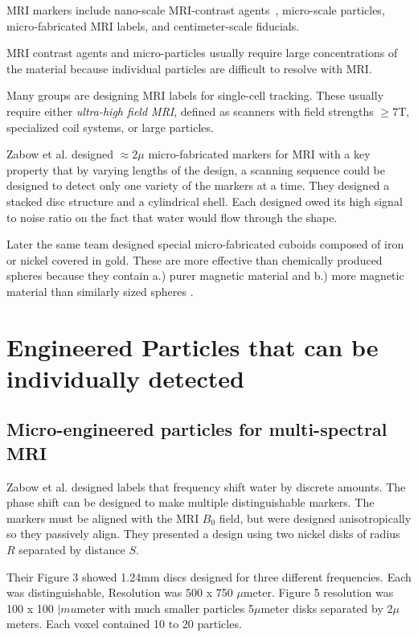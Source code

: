 \documentclass[letterpaper, 10 pt, conference]{ieeeconf}
\begin{document}
MRI markers include nano-scale MRI-contrast agents~\cite{carroll2010experimental}, micro-scale particles, micro-fabricated MRI labels, and centimeter-scale fiducials. 

MRI contrast agents and micro-particles usually require large concentrations of the material because individual particles are difficult to resolve with MRI.

Many groups are designing MRI labels for single-cell tracking.  These usually require either \emph{ultra-high field MRI}, defined as scanners with field strengths $\ge7$T, specialized coil systems, or large particles.


Zabow et al. designed $\approx2\mu$ micro-fabricated markers for MRI with a key property that by varying lengths of the design, a scanning sequence could be designed to detect only one variety of the markers at a time.  They designed a stacked disc structure and a cylindrical shell\cite{zabow2008micro}.  Each designed owed its high signal to noise ratio on the fact that water would flow through the shape.

Later the same team designed special micro-fabricated cuboids composed of iron or nickel covered in gold.  These are more effective than chemically produced spheres because they contain a.) purer magnetic material and b.) more magnetic material than similarly sized spheres \cite{zabow2009design}.


\section{Engineered Particles that can be individually detected}

\subsection{Micro-engineered  particles for multi-spectral MRI}

Zabow et al. \cite{zabow2008micro} designed labels that frequency shift water by discrete amounts.  The phase shift can be designed  to make multiple distinguishable markers.  The markers must be aligned with the MRI $B_0$ field, but were designed anisotropically so they passively align. They presented a design using two nickel disks of radius $R$ separated by distance $S$. 

Their Figure 3 showed 1.24mm discs designed for three different frequencies.  Each was distinguishable, Resolution was 500 x 750 $
\mu$meter.  Figure 5 resolution was 100 x 100 $|mu$meter with much smaller particles 5$\mu$meter disks separated by 2$\mu$meters.  Each voxel contained 10 to 20 particles.
\end{document}

